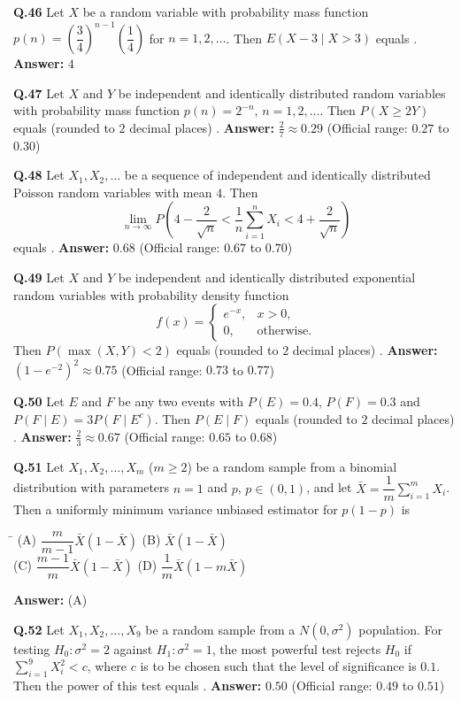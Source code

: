 \documentclass[11pt,a4paper]{article}
\newcommand{\optsfourA}[4]{%
  \begin{tabbing}
    \hspace{0.48\linewidth}\=\kill
    (A) #1 \> (B) #2 \\[2pt]
    (C) #3 \> (D) #4
  \end{tabbing}%
}
\newcommand{\ans}[1]{\textbf{Answer:} #1\par\medskip}
\begin{document}
\textbf{Q.46} Let $X$ be a random variable with probability mass function $p(n) = \left(\dfrac{3}{4}\right)^{n-1}\!\left(\dfrac{1}{4}\right)$ for $n = 1, 2, \dots$. Then $E(X - 3 \mid X > 3)$ equals \underline{\hspace{2cm}}.
\ans{$4$}

\textbf{Q.47} Let $X$ and $Y$ be independent and identically distributed random variables with probability mass function $p(n) = 2^{-n}$, $n = 1, 2, \dots$. Then $P(X \ge 2Y)$ equals (rounded to $2$ decimal places) \underline{\hspace{2cm}}.
\ans{$\frac{2}{7} \approx 0.29$ (Official range: $0.27$ to $0.30$)}

\textbf{Q.48} Let $X_1, X_2, \dots$ be a sequence of independent and identically distributed Poisson random variables with mean $4$. Then
\[
  \lim_{n\to\infty} P\!\left(4 - \frac{2}{\sqrt{n}} < \frac{1}{n}\sum_{i=1}^{n} X_i < 4 + \frac{2}{\sqrt{n}}\right)
\]
equals \underline{\hspace{2cm}}.
\ans{$0.68$ (Official range: $0.67$ to $0.70$)}

\textbf{Q.49} Let $X$ and $Y$ be independent and identically distributed exponential random variables with probability density function
\[
  f(x) = \begin{cases} e^{-x}, & x > 0, \\ 0, & \text{otherwise.} \end{cases}
\]
Then $P(\max(X, Y) < 2)$ equals (rounded to $2$ decimal places) \underline{\hspace{2cm}}.
\ans{$(1 - e^{-2})^2 \approx 0.75$ (Official range: $0.73$ to $0.77$)}

\textbf{Q.50} Let $E$ and $F$ be any two events with $P(E) = 0.4$, $P(F) = 0.3$ and $P(F \mid E) = 3 P(F \mid E^c)$. Then $P(E \mid F)$ equals (rounded to $2$ decimal places) \underline{\hspace{2cm}}.
\ans{$\frac{2}{3} \approx 0.67$ (Official range: $0.65$ to $0.68$)}

\textbf{Q.51} Let $X_1, X_2, \dots, X_m$ ($m \ge 2$) be a random sample from a binomial distribution with parameters $n = 1$ and $p$, $p \in (0, 1)$, and let $\bar{X} = \dfrac{1}{m} \displaystyle\sum_{i=1}^{m} X_i$. Then a uniformly minimum variance unbiased estimator for $p(1 - p)$ is
\optsfourA{$\dfrac{m}{m - 1}\bar{X}(1 - \bar{X})$}{$\bar{X}(1 - \bar{X})$}{$\dfrac{m - 1}{m}\bar{X}(1 - \bar{X})$}{$\dfrac{1}{m}\bar{X}(1 - m\bar{X})$}
\ans{(A)}

\textbf{Q.52} Let $X_1, X_2, \dots, X_9$ be a random sample from a $N(0, \sigma^2)$ population. For testing $H_0 : \sigma^2 = 2$ against $H_1 : \sigma^2 = 1$, the most powerful test rejects $H_0$ if $\displaystyle\sum_{i=1}^{9} X_i^2 < c$, where $c$ is to be chosen such that the level of significance is $0.1$. Then the power of this test equals \underline{\hspace{2cm}}.
\ans{$0.50$ (Official range: $0.49$ to $0.51$)}
\end{document}
